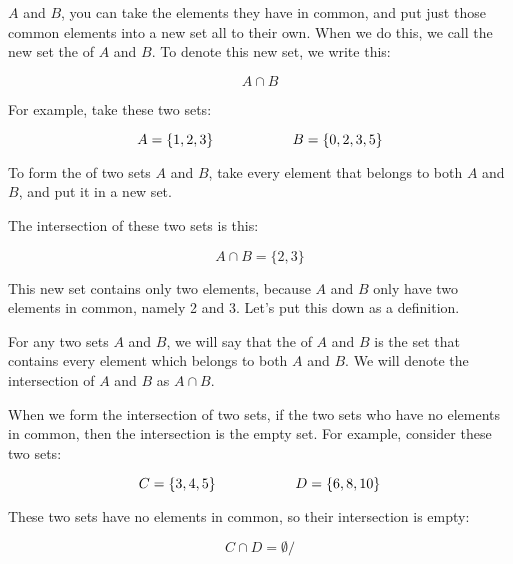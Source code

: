 \documentclass[../../../main.tex]{subfiles}
\begin{document}
 $A$ and $B$, you can take the elements they have in common, and put just those common elements into a new set all to their own. When we do this, we call the new set the  of $A$ and $B$. To denote this new set, we write this:

\begin{equation*}
  A \cap B
\end{equation*}

For example, take these two sets:

\begin{equation*}
  A = \{ 1, 2, 3 \} \hskip 2cm B = \{ 0, 2, 3, 5 \}
\end{equation*}

\begin{terminology}
  To form the  of two sets $A$ and $B$, take every element that belongs to both $A$ and $B$, and put it in a new set.
\end{terminology}

The intersection of these two sets is this:

\begin{equation*}
  A \cap B = \{ 2, 3 \}
\end{equation*}

This new set contains only two elements, because $A$ and $B$ only have two elements in common, namely 2 and 3. Let's put this down as a definition.

\begin{fdefinition}[Intersection]
  For any two sets $A$ and $B$, we will say that the  of $A$ and $B$ is the set that contains every element which belongs to both $A$ and $B$. We will denote the intersection of $A$ and $B$ as $A \cap B$.
\end{fdefinition}

When we form the intersection of two sets, if the two sets who have no elements in common, then the intersection is the empty set. For example, consider these two sets:

\begin{equation*}
  C = \{ 3, 4, 5 \} \hskip 2cm D = \{ 6, 8, 10 \}
\end{equation*}

These two sets have no elements in common, so their intersection is empty:

\begin{equation*}
  C \cap D = \emptyset/
\end{equation*}
\end{document}
